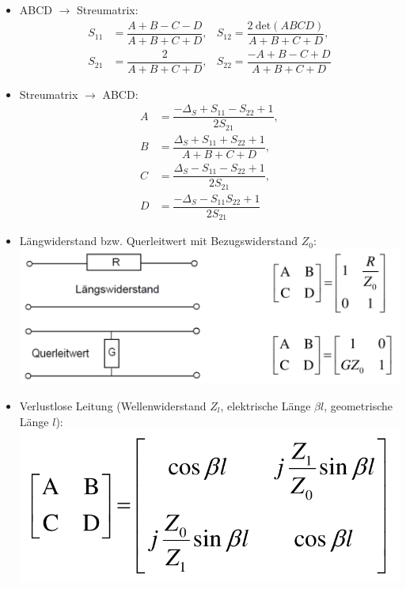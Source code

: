 {\begin{itemize}
            \(u = \dfrac{U}{\sqrt{Z_0}}; \;\; i = I\sqrt{Z_0}\)
        \item ABCD $\to$ Streumatrix:
            \begin{align*}
                S_{11} &= \dfrac{A+B-C-D}{A+B+C+D}, &S_{12} = \dfrac{2\:\mathrm{det}(ABCD)}{A+B+C+D},\\
                S_{21} &= \dfrac{2}{A+B+C+D}, &S_{22} = \dfrac{-A+B-C+D}{A+B+C+D}
            \end{align*}
        \item Streumatrix $\to$ ABCD:
            \begin{align*}
                A &= \dfrac{-\Delta_S + S_{11} - S_{22} + 1}{2 S_{21}},\\
                B &= \dfrac{\Delta_S + S_{11} + S_{22} + 1}{A+B+C+D},\\
                C &= \dfrac{\Delta_S - S_{11} - S_{22} + 1}{2 S_{21}},\\
                D &= \dfrac{-\Delta_S - S_{11} S_{22} + 1}{2 S_{21}}
            \end{align*}
        \item Längwiderstand bzw. Querleitwert mit Bezugswiderstand $Z_0$:\\
            \includegraphics[width=0.35\paperheight]{content/fuw/pictures/fuw_kettenmatrix_widerstand_leitwert.png}
        \item Verlustlose Leitung (Wellenwiderstand $Z_l$, elektrische Länge $\beta l$, geometrische Länge $l$):
                \includegraphics[width=0.28\paperheight]{content/fuw/pictures/fuw_kettenmatrix_leitung.png}
\end{itemize}
}
